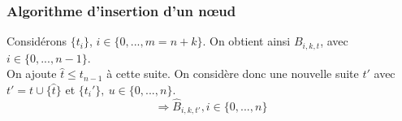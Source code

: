 \subsubsection{Algorithme d'insertion d'un n\oe ud}
Considérons $\{t_i\}$, $i\in\{0,...,m=n+k\}$. On obtient ainsi $B_{i,k,t}$, avec $i\in\{0,...,n-1\}$.\\
On ajoute $\hat{t}\leq t_{n-1}$ à cette suite. On considère donc une nouvelle suite $t'$ avec $t'=t\cup\{\hat t\}$ et $\{t_i'\},\ u\in\{0,...,n\}$.
\[\Rightarrow \hat{B}_{i,k,t'}, i\in\{0,...,n\}\]

